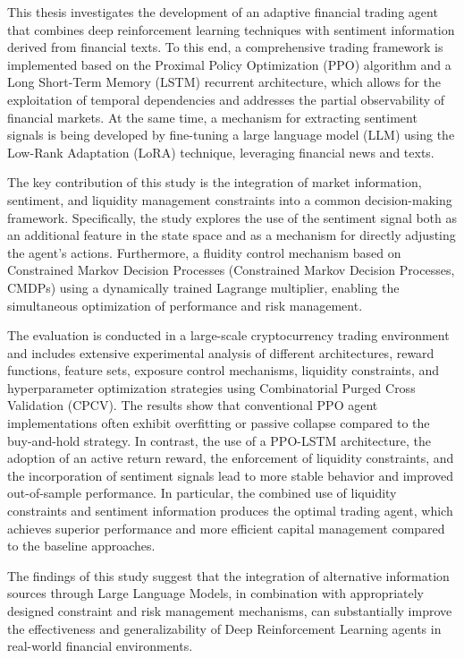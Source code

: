This thesis investigates the development of an adaptive financial trading agent that combines deep reinforcement learning techniques with sentiment information 
derived from financial texts. To this end, a comprehensive trading framework is implemented based on the Proximal Policy Optimization (PPO) algorithm and a Long 
Short-Term Memory (LSTM) recurrent architecture, which allows for the exploitation of temporal dependencies and addresses the partial observability of financial 
markets. At the same time, a mechanism for extracting sentiment signals is being developed by fine-tuning a large language model (LLM) using the Low-Rank Adaptation 
(LoRA) technique, leveraging financial news and texts.

The key contribution of this study is the integration of market information, sentiment, and liquidity management constraints into a common decision-making framework. 
Specifically, the study explores the use of the sentiment signal both as an additional feature in the state space and as a mechanism for directly adjusting the 
agent’s actions. Furthermore, a fluidity control mechanism based on Constrained Markov Decision Processes (Constrained Markov Decision Processes, CMDPs) 
using a dynamically trained Lagrange multiplier, enabling the simultaneous optimization of performance and risk management.

The evaluation is conducted in a large-scale cryptocurrency trading environment and includes extensive experimental analysis of different architectures, 
reward functions, feature sets, exposure control mechanisms, liquidity constraints, and hyperparameter optimization strategies using Combinatorial Purged Cross 
Validation (CPCV). The results show that conventional PPO agent implementations often exhibit overfitting or passive collapse compared to the buy-and-hold strategy. 
In contrast, the use of a PPO-LSTM architecture, the adoption of an active return reward, the enforcement of liquidity constraints, and the incorporation of sentiment 
signals lead to more stable behavior and improved out-of-sample performance. In particular, the combined use of liquidity constraints and sentiment information 
produces the optimal trading agent, which achieves superior performance and more efficient capital management compared to the baseline approaches.

The findings of this study suggest that the integration of alternative information sources through Large Language Models, in combination with appropriately 
designed constraint and risk management mechanisms, can substantially improve the effectiveness and generalizability of Deep Reinforcement Learning agents 
in real-world financial environments.